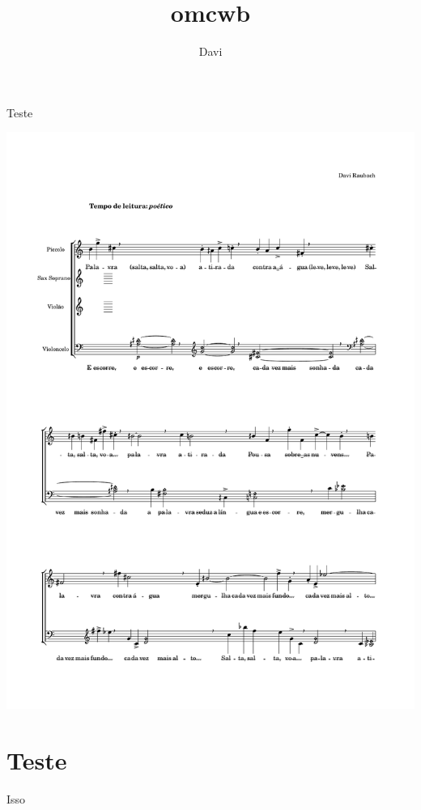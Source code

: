 \documentclass[a4paper]{article}
\author{Davi}
\date{}
\title{omcwb}
\begin{document}
\maketitle
Teste
\begin{center}
\includegraphics[page=1-2,width=.9\linewidth]{score_org.pdf}
\end{center}

\section*{Teste}
\label{sec:org5708fa5}
Isso
\end{document}
